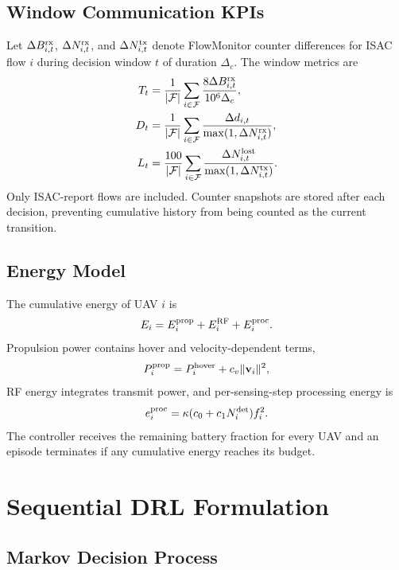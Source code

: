 \documentclass[10pt,conference]{IEEEtran}
\begin{document}
\subsection{Window Communication KPIs}

Let $\Delta B^{\rm rx}_{i,t}$, $\Delta N^{\rm rx}_{i,t}$, and
$\Delta N^{\rm tx}_{i,t}$ denote FlowMonitor counter differences for ISAC flow
$i$ during decision window $t$ of duration $\Delta_c$. The window metrics are
\begin{align}
T_t &= \frac{1}{|\mathcal F|}\sum_{i\in\mathcal F}
\frac{8\Delta B^{\rm rx}_{i,t}}{10^6\Delta_c},\\
D_t &= \frac{1}{|\mathcal F|}\sum_{i\in\mathcal F}
\frac{\Delta d_{i,t}}{\max(1,\Delta N^{\rm rx}_{i,t})},\\
L_t &= \frac{100}{|\mathcal F|}\sum_{i\in\mathcal F}
\frac{\Delta N^{\rm lost}_{i,t}}{\max(1,\Delta N^{\rm tx}_{i,t})}.
\end{align}
Only ISAC-report flows are included. Counter snapshots are stored after each
decision, preventing cumulative history from being counted as the current
transition.

\subsection{Energy Model}

The cumulative energy of UAV $i$ is
\begin{equation}
E_i=E_i^{\rm prop}+E_i^{\rm RF}+E_i^{\rm proc}.
\end{equation}
Propulsion power contains hover and velocity-dependent terms,
\begin{equation}
P_i^{\rm prop}=P_i^{\rm hover}+c_v\|\mathbf v_i\|^2,
\end{equation}
RF energy integrates transmit power, and per-sensing-step processing energy is
\begin{equation}
e_i^{\rm proc}=\kappa(c_0+c_1N_i^{\rm det})f_i^2.
\end{equation}
The controller receives the remaining battery fraction for every UAV and an
episode terminates if any cumulative energy reaches its budget.

\section{Sequential DRL Formulation}

\subsection{Markov Decision Process}
\end{document}
